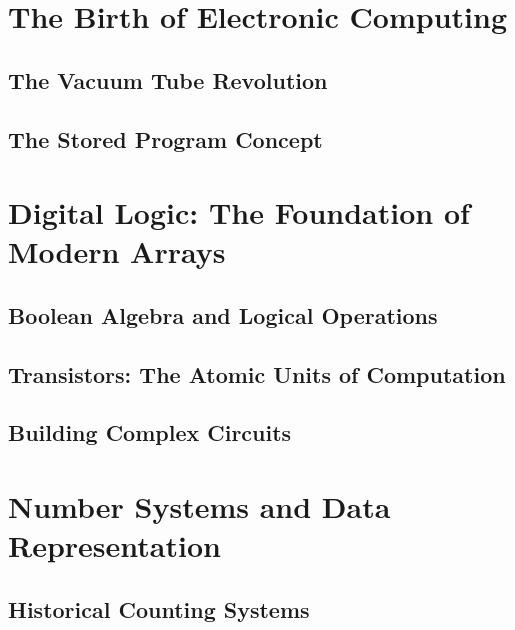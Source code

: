 \documentclass[12pt, oneside, openany]{book}
\begin{document}

\chapter{The Birth of Electronic Computing}

\section{The Vacuum Tube Revolution}
\section{The Stored Program Concept}


\chapter{Digital Logic: The Foundation of Modern Arrays}

\section{Boolean Algebra and Logical Operations}

\section{Transistors: The Atomic Units of Computation}

\section{Building Complex Circuits}



\chapter{Number Systems and Data Representation}
\section{Historical Counting Systems}
\end{document}
